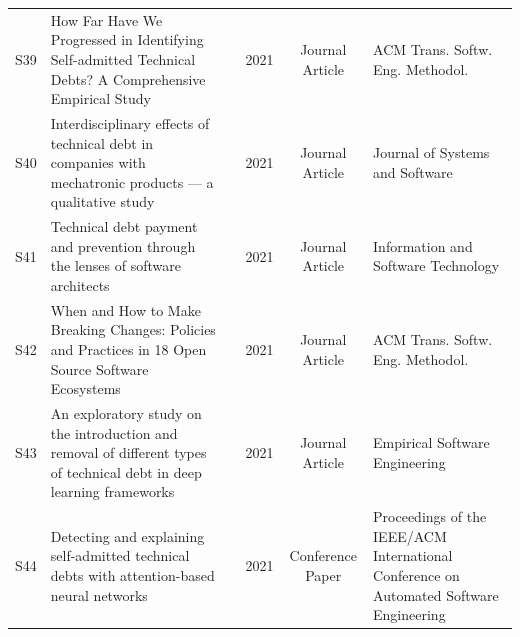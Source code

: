 \documentclass[12pt,reqno, twoside]{amsbook}
\theoremstyle{plain}
\numberwithin{equation}{chapter}
\numberwithin{section}{chapter}
\begin{document}
\begin{landscape}
\begin{center}
\begin{longtable}{|c|p{5cm}|p{4.5cm}|c|c|p{5.5cm}|}
S39 & How Far Have We Progressed in Identifying Self-admitted Technical Debts? A Comprehensive Empirical Study & \citeauthor{Guo2021} & 2021 & Journal Article & ACM Trans. Softw. Eng. Methodol. \\
S40 & Interdisciplinary effects of technical debt in companies with mechatronic products — a qualitative study & \citeauthor{Vogel-Heuser2021} & 2021 & Journal Article & Journal of Systems and Software \\
S41 & Technical debt payment and prevention through the lenses of software architects & \citeauthor{Perez2021} & 2021 & Journal Article & Information and Software Technology \\
S42 & When and How to Make Breaking Changes: Policies and Practices in 18 Open Source Software Ecosystems & \citeauthor{Bogart2021} & 2021 & Journal Article & ACM Trans. Softw. Eng. Methodol. \\
S43 & An exploratory study on the introduction and removal of different types of technical debt in deep learning frameworks & \citeauthor{Liu2021} & 2021 & Journal Article & Empirical Software Engineering \\
S44 & Detecting and explaining self-admitted technical debts with attention-based neural networks & \citeauthor{Wang2021} & 2021 & Conference Paper & Proceedings of the IEEE/ACM International Conference on Automated Software Engineering \\


\end{longtable}
\end{center}
\end{landscape}
\end{document}
